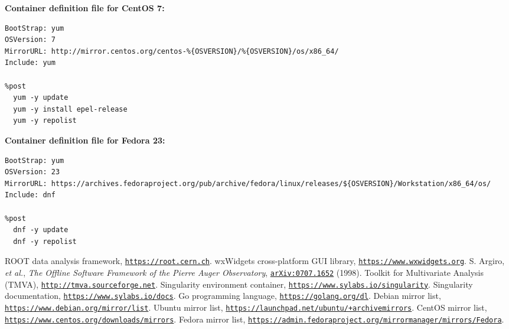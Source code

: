 \documentclass[12pt,a4paper]{report}
\begin{document}
\begin{appendices}
{\noindent}\textbf{Container definition file for CentOS 7:}
\begin{lstlisting}
BootStrap: yum
OSVersion: 7
MirrorURL: http://mirror.centos.org/centos-%{OSVERSION}/%{OSVERSION}/os/x86_64/
Include: yum

%post
  yum -y update
  yum -y install epel-release
  yum -y repolist
\end{lstlisting}
{\noindent}\textbf{Container definition file for Fedora 23:}
\begin{lstlisting}
BootStrap: yum
OSVersion: 23
MirrorURL: https://archives.fedoraproject.org/pub/archive/fedora/linux/releases/${OSVERSION}/Workstation/x86_64/os/
Include: dnf

%post
  dnf -y update
  dnf -y repolist
\end{lstlisting}

\end{appendices}

\pagebreak
\titleformat{\chapter}[hang]{\normalfont\bf}{}{12pt}{\Large}
\begin{thebibliography}{50} 
\raggedright
{} ROOT data analysis framework, \href{https://root.cern.ch}{\texttt{https://root.cern.ch}}.
 wxWidgets cross-platform GUI library, \href{https://www.wxwidgets.org}{\texttt{https://www.wxwidgets.org}}.
 S. Argiro, \emph{et al.}, \emph{The Offline Software Framework of the Pierre Auger Observatory}, \href{http://arxiv.org/pdf/0707.1652v1.pdf}{\texttt{arXiv:0707.1652}} (1998).
 Toolkit for Multivariate Analysis (TMVA), \href{http://tmva.sourceforge.net}{\texttt{http://tmva.sourceforge.net}}.
 Singularity environment container, \href{https://www.sylabs.io/singularity}{\texttt{https://www.sylabs.io/singularity}}.
 Singularity documentation, \href{https://www.sylabs.io/docs}{\texttt{https://www.sylabs.io/docs}}.
 Go programming language, \href{https://golang.org/dl}{\texttt{https://golang.org/dl}}.
 Debian mirror list, \href{https://www.debian.org/mirror/list}{\texttt{https://www.debian.org/mirror/list}}.
 Ubuntu mirror list, \href{https://launchpad.net/ubuntu/+archivemirrors}{\texttt{https://launchpad.net/ubuntu/+archivemirrors}}.
 CentOS mirror list, \href{https://www.centos.org/downloads/mirrors}{\texttt{https://www.centos.org/downloads/mirrors}}.
 Fedora mirror list, \href{https://admin.fedoraproject.org/mirrormanager/mirrors/Fedora}{\texttt{https://admin.fedoraproject.org/mirrormanager/mirrors/Fedora}}.
\end{thebibliography}
\end{document}
